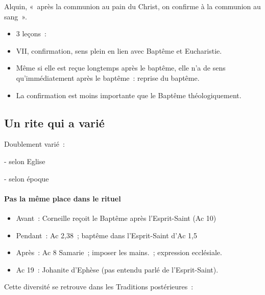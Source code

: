Alquin, «~après la communion au pain du Christ, on confirme à la
communion au sang~».

\begin{itemize}
\item
  3 leçons~:
\item
   
  VII, confirmation, sens plein en lien avec Baptême et Eucharistie.
   
\item
   
  Même si elle est reçue longtemps après le baptême, elle n'a de sens
  qu'immédiatement après le baptême~: reprise du baptême.
   
\item
   
  La confirmation est moins importante que le Baptême théologiquement.
   
\end{itemize}

\hypertarget{un-rite-qui-a-variuxe9}{%
\subsection{Un rite qui a varié}\label{un-rite-qui-a-variuxe9}}

Doublement varié~:

- selon Eglise

- selon époque

\hypertarget{pas-la-muxeame-place-dans-le-rituel}{%
\paragraph{Pas la même place dans le
rituel}\label{pas-la-muxeame-place-dans-le-rituel}}

\begin{itemize}
\item
  Avant~: Corneille reçoit le Baptême après l'Esprit-Saint (Ac 10)
\item
  Pendant~: Ac 2,38~; baptême dans l'Esprit-Saint d'Ac 1,5
\item
  Après~: Ac 8 Samarie~; imposer les mains.~; expression ecclésiale.
\item
   
  Ac 19~: Johanite d'Ephèse (pas entendu parlé de l'Esprit-Saint).
   
\end{itemize}

Cette diversité se retrouve dans les Traditions postérieures~:

